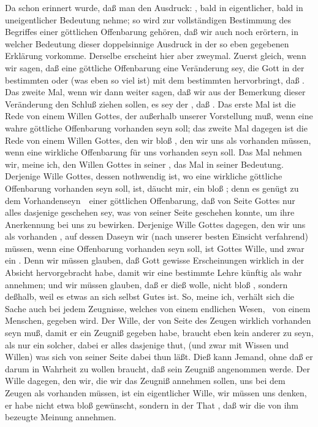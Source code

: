\begin{aufza}
\item Da schon erinnert wurde, daß man den Ausdruck: , bald in eigentlicher, bald in uneigentlicher Bedeutung nehme; so wird zur vollständigen Bestimmung des Begriffes einer göttlichen Offenbarung gehören, daß wir auch noch erörtern, in welcher Bedeutung dieser doppelsinnige Ausdruck in der so eben gegebenen Erklärung vorkomme. Derselbe erscheint hier aber zweymal. Zuerst gleich, wenn wir sagen, daß eine göttliche Offenbarung eine Veränderung sey, die Gott in der bestimmten  oder (was eben so viel ist) mit dem bestimmten  hervorbringt, daß \usw. Das zweite Mal, wenn wir dann weiter sagen, daß wir aus der Bemerkung dieser Veränderung den Schluß ziehen sollen, es sey der , daß \usw. Das erste Mal ist die Rede von einem Willen Gottes, der außerhalb unserer Vorstellung  muß, wenn eine wahre göttliche Offenbarung vorhanden seyn soll; das zweite Mal dagegen ist die Rede von einem Willen Gottes, den wir bloß , den wir uns als vorhanden  müssen, wenn eine wirkliche Offenbarung für uns vorhanden seyn soll. Das  Mal nehmen wir, meine ich, den Willen Gottes in seiner , das  Mal in seiner  Bedeutung. Derjenige Wille Gottes, dessen  nothwendig ist, wo eine wirkliche göttliche Offenbarung vorhanden seyn soll, ist, däucht mir, ein bloß ; denn es genügt zu dem Vorhandenseyn~\ einer göttlichen Offenbarung, daß von Seite Gottes nur alles dasjenige geschehen sey, was von seiner Seite geschehen konnte, um ihre Anerkennung bei uns zu bewirken. Derjenige Wille Gottes dagegen, den wir uns als vorhanden , auf dessen Daseyn wir (nach unserer besten Einsicht verfahrend)  müssen, wenn eine Offenbarung vorhanden seyn soll, ist Gottes  Wille, und zwar ein . Denn wir müssen glauben, daß Gott gewisse Erscheinungen wirklich in der Absicht hervorgebracht habe, damit wir eine bestimmte Lehre künftig als wahr annehmen; und wir müssen glauben, daß er dieß wolle, nicht bloß , sondern  deßhalb, weil es etwas an sich selbst Gutes ist. So, meine ich, verhält sich die Sache auch bei jedem Zeugnisse, welches von einem endlichen Wesen, \zB\ von einem Menschen, gegeben wird. Der Wille, der von Seite des Zeugen wirklich vorhanden seyn muß, damit er ein Zeugniß gegeben habe, braucht eben kein anderer zu seyn, als nur ein solcher, dabei er alles dasjenige thut, (und zwar mit Wissen und Willen) was sich von seiner Seite dabei thun läßt. Dieß kann Jemand, ohne daß er darum in Wahrheit zu wollen braucht, daß sein Zeugniß angenommen werde. Der Wille dagegen, den wir, die wir das Zeugniß annehmen sollen, uns bei dem Zeugen als vorhanden  müssen, ist ein eigentlicher Wille, wir müssen uns denken, er habe nicht etwa bloß gewünscht, sondern in der That , daß wir die von ihm bezeugte Meinung annehmen.
\end{aufza}

